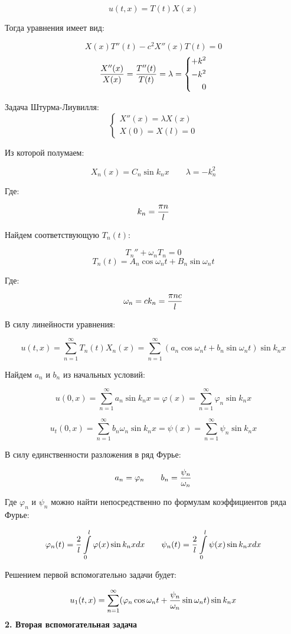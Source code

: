 \documentclass[a4paper]{article}
\begin{document}
$$
    u(t,x) = T(t)X(x)
$$

Тогда уравнения имеет вид:

$$ X(x)T''(t) - c^2X''(x)T(t) = 0 $$
$$
{X''(x) \over X(x)}={T''(t) \over T(t)}=\lambda=
    \left\{
    \begin{aligned}
    +k^2 \\
    -k^2 \\
    0 
    \end{aligned}
\right.
$$

Задача Штурма-Лиувилля:
$$\left\{
\begin{aligned}
X''(x)=\lambda X(x) \\
X(0)=X(l)=0
\end{aligned}
\right.$$

Из которой полумаем:

$$X_n(x)=C_n\sin k_{n}x \qquad \lambda=-k_n^2$$

Где:

$$k_n= {\pi n \over l}$$

Найдем соответствующую $T_n(t)$:

$$ T_n''+ \omega_n T_n=0 $$
$$T_n(t)=A_n\cos\omega_{n}t+B_n\sin\omega_{n}t$$

Где:

$$\omega_n=ck_n={\pi {nc} \over l}$$

В силу линейности уравнения:

$$u(t,x)=\sum\limits_{n=1}^{\infty}T_n(t)X_n(x)=\sum\limits_{n=1}^{\infty}(a_n\cos\omega_{n}t+b_n\sin\omega_{n}t)\sin k_{n}x$$

Найдем $a_n$ и $b_n$ из начальных условий:

$$u(0,x)=\sum\limits_{n=1}^{\infty}a_n\sin k_{n}x=\varphi(x)=\sum\limits_{n=1}^{\infty}\varphi_n\sin k_{n}x$$

$$u_t(0,x)=\sum\limits_{n=1}^{\infty}b_n\omega_n\sin k_{n}x=\psi(x)=\sum\limits_{n=1}^{\infty}\psi_n\sin k_{n}x$$

В силу единственности разложения в ряд Фурье:

$$a_n=\varphi_n \qquad b_n={\psi_n \over \omega_n}$$

Где $\varphi_n$ и $\psi_n$ можно найти непосредственно по формулам коэффициентов ряда Фурье:

$$\varphi_n(t)= {2 \over l} \int\limits_0^l\varphi(x)\sin k_{n}xdx \qquad \psi_n(t)= {2 \over l} \int\limits_0^l\psi(x)\sin k_{n}xdx$$

Решением первой вспомогательно задачи будет:

$$u_1(t,x)=\sum\limits_{n=1}^{\infty}(\varphi_n\cos\omega_{n}t+{\psi_n \over \omega_n }\sin\omega_{n}t)\sin k_{n}x$$
\textbf{2. Вторая вспомогательная задача}
\end{document}
